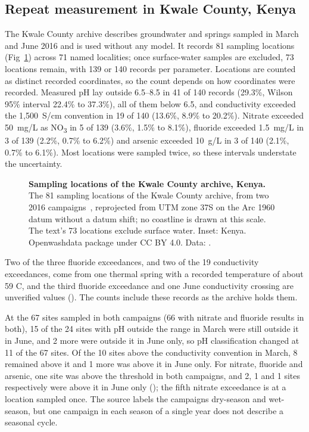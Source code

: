 \documentclass[10pt,letterpaper]{article}
\begin{document}
\subsection*{Repeat measurement in Kwale County, Kenya}

The Kwale County archive describes groundwater and springs sampled in March and June 2016 and is used without any model. It records 81 sampling locations (Fig~\ref{fig:kwale-map}) across 71 named localities; once surface-water samples are excluded, 73 locations remain, with 139 or 140 records per parameter. Locations are counted as distinct recorded coordinates, so the count depends on how coordinates were recorded. Measured pH lay outside 6.5--8.5 in 41 of 140 records (29.3\%, Wilson 95\% interval 22.4\% to 37.3\%), all of them below 6.5, and conductivity exceeded the 1,500~\textmu{}S/cm convention in 19 of 140 (13.6\%, 8.9\% to 20.2\%). Nitrate exceeded 50~mg/L as NO\textsubscript{3} in 5 of 139 (3.6\%, 1.5\% to 8.1\%), fluoride exceeded 1.5~mg/L in 3 of 139 (2.2\%, 0.7\% to 6.2\%) and arsenic exceeded 10~\textmu{}g/L in 3 of 140 (2.1\%, 0.7\% to 6.1\%). Most locations were sampled twice, so these intervals understate the uncertainty.\label{callout:fig:kwale-map}

\begin{figure}[!ht]
\caption{\textbf{Sampling locations of the Kwale County archive, Kenya.} The 81 sampling locations of the Kwale County archive, from two 2016 campaigns~\cite{OWD-grdwtrsmpkwale}, reprojected from UTM zone 37S on the Arc 1960 datum without a datum shift; no coastline is drawn at this scale. The text's 73 locations exclude surface water. Inset: Kenya. Openwashdata package under CC BY 4.0. Data: .}
\label{fig:kwale-map}
\end{figure}

Two of the three fluoride exceedances, and two of the 19 conductivity exceedances, come from one thermal spring with a recorded temperature of about 59 \textdegree{}C, and the third fluoride exceedance and one June conductivity crossing are unverified values (). The counts include these records as the archive holds them.

At the 67 sites sampled in both campaigns (66 with nitrate and fluoride results in both), 15 of the 24 sites with pH outside the range in March were still outside it in June, and 2 more were outside it in June only, so pH classification changed at 11 of the 67 sites. Of the 10 sites above the conductivity convention in March, 8 remained above it and 1 more was above it in June only. For nitrate, fluoride and arsenic, one site was above the threshold in both campaigns, and 2, 1 and 1 sites respectively were above it in June only (); the fifth nitrate exceedance is at a location sampled once. The source labels the campaigns dry-season and wet-season, but one campaign in each season of a single year does not describe a seasonal cycle.
\end{document}
